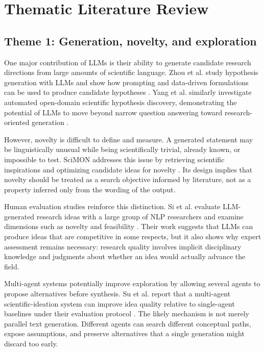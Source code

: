 \documentclass[11pt]{article}
\begin{document}
\section{Thematic Literature Review}
\label{sec:thematic-literature-review}

\subsection{Theme 1: Generation, novelty, and exploration}
\label{subsec:generation-novelty-exploration}

One major contribution of LLMs is their ability to generate candidate research directions from large
amounts of scientific language. Zhou et al. study hypothesis generation with LLMs and show how
prompting and data-driven formulations can be used to produce candidate hypotheses
\cite{zhou2024hypothesis}. Yang et al. similarly investigate automated open-domain scientific
hypothesis discovery, demonstrating the potential of LLMs to move beyond narrow question
answering toward research-oriented generation \cite{yang2024large}.

However, novelty is difficult to define and measure. A generated statement may be linguistically
unusual while being scientifically trivial, already known, or impossible to test. SciMON addresses
this issue by retrieving scientific inspirations and optimizing candidate ideas for novelty
\cite{wang2024scimon}. Its design implies that novelty should be treated as a search objective
informed by literature, not as a property inferred only from the wording of the output.

Human evaluation studies reinforce this distinction. Si et al. evaluate LLM-generated research ideas
with a large group of NLP researchers and examine dimensions such as novelty and feasibility
\cite{si2025novel}. Their work suggests that LLMs can produce ideas that are competitive in some
respects, but it also shows why expert assessment remains necessary: research quality involves
implicit disciplinary knowledge and judgments about whether an idea would actually advance the
field.

Multi-agent systems potentially improve exploration by allowing several agents to propose
alternatives before synthesis. Su et al. report that a multi-agent scientific-ideation system can
improve idea quality relative to single-agent baselines under their evaluation protocol
\cite{su2025many}. The likely mechanism is not merely parallel text generation. Different agents
can search different conceptual paths, expose assumptions, and preserve alternatives that a single
generation might discard too early.
\end{document}
